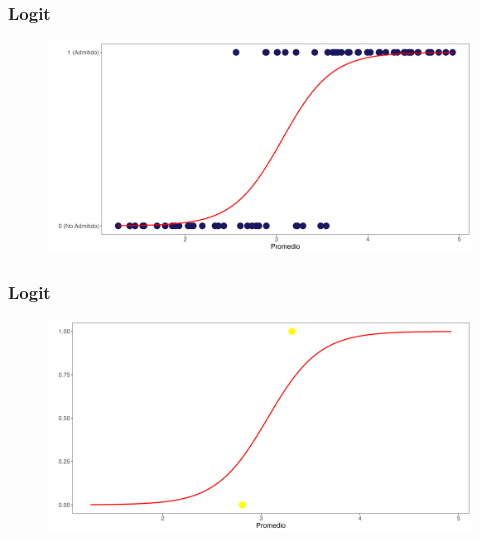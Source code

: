 \documentclass[
  shownotes,
  xcolor={svgnames},
  hyperref={colorlinks,citecolor=DarkBlue,linkcolor=andesred,urlcolor=DarkBlue}
  , aspectratio=169]{beamer}
\begin{document}
\begin{frame}[fragile]
\frametitle{Logit}



        \begin{figure}[H] \centering
            \captionsetup{justification=centering}
              \includegraphics[scale=0.45]{figures/fig3}
              
 \end{figure}



\end{frame}
\begin{frame}[fragile]
\frametitle{Logit}



        \begin{figure}[H] \centering
            \captionsetup{justification=centering}
              \includegraphics[scale=0.45]{figures/fig4}
              
 \end{figure}



\end{frame}
\end{document}
